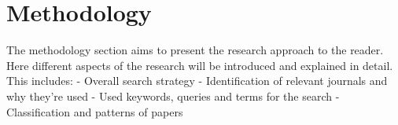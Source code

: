 \section{Methodology}
The methodology section aims to present the research approach to the reader. Here different aspects of the research will be introduced and explained in detail. This includes:
-	Overall search strategy
-	Identification of relevant journals and why they’re used
-	Used keywords, queries and terms for the search
-	Classification and patterns of papers
